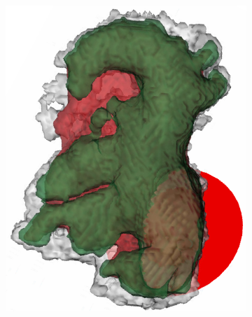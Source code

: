 \documentclass[review]{elsarticle}
\begin{document}
\begin{figure}[t]
\begin{subfigure}[b]{.18\linewidth}
    \includegraphics[width=\textwidth]{fig15_2.png}
    \caption{}
  \end{subfigure}%
  \begin{subfigure}[b]{.16\linewidth}
    \centering

\end{subfigure}
\end{figure}
\end{document}
